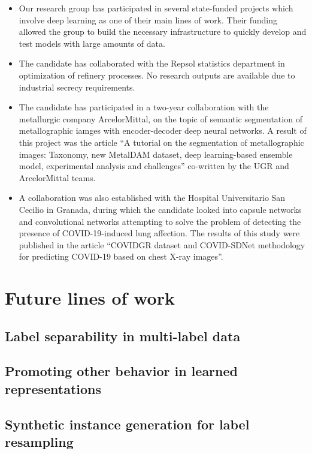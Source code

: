 \begin{itemize}
    \item Our research group has participated in several state-funded projects which involve deep learning as one of their main lines of work. Their funding allowed the group to build the necessary infrastructure to quickly develop and test models with large amounts of data.
    \item The candidate has collaborated with the Repsol statistics department in optimization of refinery processes. No research outputs are available due to industrial secrecy requirements.
    \item The candidate has participated in a two-year collaboration with the metallurgic company ArcelorMittal, on the topic of semantic segmentation of metallographic iamges with encoder-decoder deep neural networks. A result of this project was the article ``A tutorial on the segmentation of metallographic images: Taxonomy, new MetalDAM dataset, deep learning-based ensemble model, experimental analysis and challenges'' co-written by the UGR and ArcelorMittal teams.
    \item A collaboration was also established with the Hospital Universitario San Cecilio in Granada, during which the candidate looked into capsule networks and convolutional networks attempting to solve the problem of detecting the presence of COVID-19-induced lung affection. The results of this study were published in the article ``COVIDGR dataset and COVID-SDNet methodology for predicting COVID-19 based on chest X-ray images''.
\end{itemize}

\section{Future lines of work}

\subsection{Label separability in multi-label data}

\subsection{Promoting other behavior in learned representations}

\subsection{Synthetic instance generation for label resampling}

